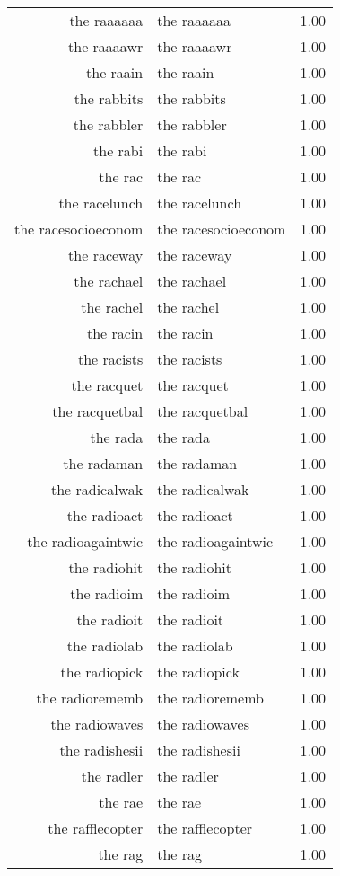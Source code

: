 \begin{table}[ht]
\begin{tabular}{rlr}
  the raaaaaa & the raaaaaa & 1.00 \\ 
  the raaaawr & the raaaawr & 1.00 \\ 
  the raain & the raain & 1.00 \\ 
  the rabbits & the rabbits & 1.00 \\ 
  the rabbler & the rabbler & 1.00 \\ 
  the rabi & the rabi & 1.00 \\ 
  the rac & the rac & 1.00 \\ 
  the racelunch & the racelunch & 1.00 \\ 
  the racesocioeconom & the racesocioeconom & 1.00 \\ 
  the raceway & the raceway & 1.00 \\ 
  the rachael & the rachael & 1.00 \\ 
  the rachel & the rachel & 1.00 \\ 
  the racin & the racin & 1.00 \\ 
  the racists & the racists & 1.00 \\ 
  the racquet & the racquet & 1.00 \\ 
  the racquetbal & the racquetbal & 1.00 \\ 
  the rada & the rada & 1.00 \\ 
  the radaman & the radaman & 1.00 \\ 
  the radicalwak & the radicalwak & 1.00 \\ 
  the radioact & the radioact & 1.00 \\ 
  the radioagaintwic & the radioagaintwic & 1.00 \\ 
  the radiohit & the radiohit & 1.00 \\ 
  the radioim & the radioim & 1.00 \\ 
  the radioit & the radioit & 1.00 \\ 
  the radiolab & the radiolab & 1.00 \\ 
  the radiopick & the radiopick & 1.00 \\ 
  the radiorememb & the radiorememb & 1.00 \\ 
  the radiowaves & the radiowaves & 1.00 \\ 
  the radishesii & the radishesii & 1.00 \\ 
  the radler & the radler & 1.00 \\ 
  the rae & the rae & 1.00 \\ 
  the rafflecopter & the rafflecopter & 1.00 \\ 
  the rag & the rag & 1.00 \\ 

\end{tabular}
\end{table}
